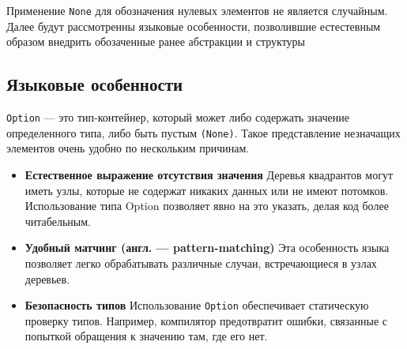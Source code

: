 Применение \texttt{None} для обозначения нулевых элементов не является случайным. Далее будут рассмотренны языковые особенности, позволившие естестевным образом внедрить обозаченные ранее абстракции и структуры

\subsection{Языковые особенности \fsharp}
\texttt{Option} --- это тип-контейнер, который может либо содержать значение определенного типа, либо быть пустым \texttt{(None)}. Такое представление незначащих элементов очень удобно по нескольким причинам.
\begin{itemize}
\item{\textbf{Естественное выражение отсутствия значения}} \newline
Деревья квадрантов могут иметь узлы, которые не содержат никаких данных или не имеют потомков. Использование типа Option позволяет явно на это указать, делая код более читабельным.
\item{\textbf{Удобный матчинг (англ. --- pattern-matching)}} \newline
Эта особенность языка позволяет легко обрабатывать различные случаи, встречающиеся в узлах деревьев.
\item{\textbf{Безопасность типов}} \newline
Использование \texttt{Option} обеспечивает статическую проверку типов. Например, компилятор предотвратит ошибки, связанные с попыткой обращения к значению там, где его нет.
\end{itemize}